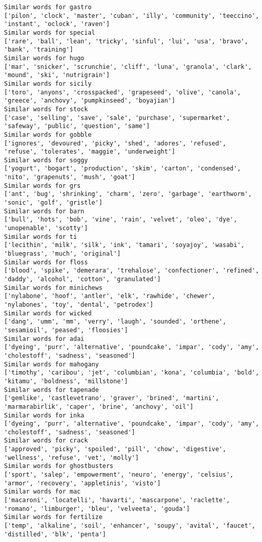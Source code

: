 \documentclass[11pt]{article}
\begin{document}
\begin{Verbatim}[commandchars=\\\{\}]
Similar words for gastro
['pilon', 'clock', 'master', 'cuban', 'illy', 'community', 'teeccino', 'instant', 'oclock', 'raven']
Similar words for special
['rare', 'ball', 'lean', 'tricky', 'sinful', 'lui', 'usa', 'bravo', 'bank', 'training']
Similar words for hugo
['mar', 'snicker', 'scrunchie', 'cliff', 'luna', 'granola', 'clark', 'mound', 'ski', 'nutrigrain']
Similar words for sicily
['toro', 'anyons', 'crosspacked', 'grapeseed', 'olive', 'canola', 'greece', 'anchovy', 'pumpkinseed', 'boyajian']
Similar words for stock
['case', 'selling', 'save', 'sale', 'purchase', 'supermarket', 'safeway', 'public', 'question', 'same']
Similar words for gobble
['ignores', 'devoured', 'picky', 'shed', 'adores', 'refused', 'refuse', 'tolerates', 'maggie', 'underweight']
Similar words for soggy
['yogurt', 'bogart', 'production', 'skim', 'carton', 'condensed', 'nito', 'grapenuts', 'mush', 'goat']
Similar words for grs
['ant', 'bug', 'shrinking', 'charm', 'zero', 'garbage', 'earthworm', 'sonic', 'golf', 'gristle']
Similar words for barn
['bull', 'hots', 'bob', 'vine', 'rain', 'velvet', 'oleo', 'dye', 'unopenable', 'scotty']
Similar words for ti
['lecithin', 'milk', 'silk', 'ink', 'tamari', 'soyajoy', 'wasabi', 'bluegrass', 'much', 'original']
Similar words for floss
['blood', 'spike', 'demerara', 'trehalose', 'confectioner', 'refined', 'daddy', 'alcohol', 'cotton', 'granulated']
Similar words for minichews
['nylabone', 'hoof', 'antler', 'elk', 'rawhide', 'chewer', 'nylabones', 'toy', 'dental', 'petrodex']
Similar words for wicked
['dang', 'umm', 'mm', 'verry', 'laugh', 'sounded', 'orthene', 'sesamioil', 'peased', 'floosies']
Similar words for adai
['dyeing', 'purr', 'alternative', 'poundcake', 'impar', 'cody', 'amy', 'cholestoff', 'sadness', 'seasoned']
Similar words for mahogany
['timothy', 'caribou', 'jet', 'columbian', 'kona', 'columbia', 'bold', 'kitamu', 'boldness', 'millstone']
Similar words for tapenade
['gemlike', 'castlevetrano', 'graver', 'brined', 'martini', 'marmarabirlik', 'caper', 'brine', 'anchovy', 'oil']
Similar words for inka
['dyeing', 'purr', 'alternative', 'poundcake', 'impar', 'cody', 'amy', 'cholestoff', 'sadness', 'seasoned']
Similar words for crack
['approved', 'picky', 'spoiled', 'pill', 'chow', 'digestive', 'wellness', 'refuse', 'vet', 'molly']
Similar words for ghostbusters
['sport', 'salep', 'empowerment', 'neuro', 'energy', 'celsius', 'armor', 'recovery', 'appletinis', 'visto']
Similar words for mac
['macaroni', 'locatelli', 'havarti', 'mascarpone', 'raclette', 'romano', 'limburger', 'bleu', 'velveeta', 'gouda']
Similar words for fertilize
['temp', 'alkaline', 'soil', 'enhancer', 'soupy', 'avital', 'faucet', 'distilled', 'blk', 'penta']

\end{Verbatim}
\end{document}
